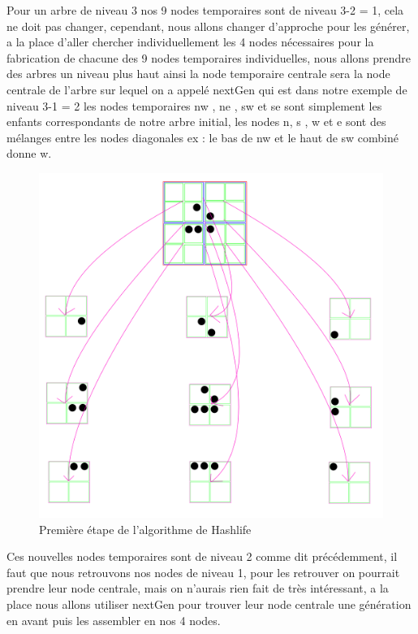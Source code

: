 Pour un arbre de niveau 3 nos 9 nodes temporaires sont de niveau 3-2 = 1, cela ne doit pas changer, cependant, nous allons changer d'approche pour les générer, a la place d'aller chercher  individuellement les 4 nodes nécessaires pour la fabrication de chacune des 9 nodes temporaires individuelles, nous allons prendre des arbres un niveau plus haut ainsi la node temporaire centrale sera la node centrale de l'arbre sur lequel on a appelé nextGen qui est dans notre exemple de niveau 3-1 = 2 les nodes temporaires nw , ne , sw et se sont simplement les enfants correspondants de notre arbre initial, les nodes n, s , w et e sont des mélanges entre les nodes diagonales ex : le bas de nw et le haut de sw combiné donne w.
\begin{figure}[H]
        \center
        \includegraphics[scale=0.1]{images/imgHashlife/HashlifeStep1.png}
        \caption{Première étape de l'algorithme de Hashlife}
\end{figure}
Ces nouvelles nodes temporaires sont de niveau 2 comme dit précédemment, il faut que nous retrouvons nos nodes de niveau 1, pour les retrouver on pourrait prendre leur node centrale, mais on n'aurais rien fait de très intéressant, a la place nous allons utiliser nextGen pour trouver leur node centrale une génération en avant puis les assembler en nos 4 nodes.
